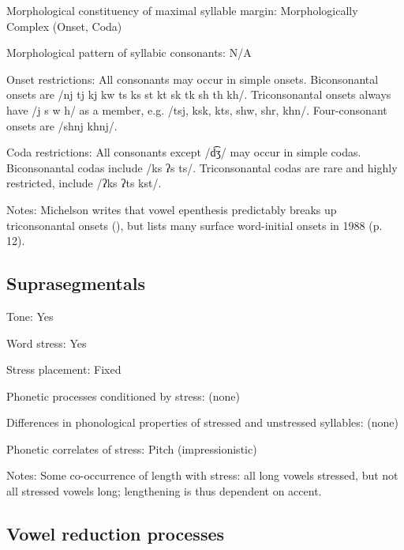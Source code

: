 {\begin{appendixdesc}
\item[Morphological constituency of maximal syllable margin:] Morphologically Complex (Onset, Coda)

\item[Morphological pattern of syllabic consonants:] N/A

\item[Onset restrictions:] All consonants may occur in simple onsets. Biconsonantal onsets are /nj tj kj kw ts ks st kt sk tk sh th kh/. Triconsonantal onsets always have /j s w h/ as a member, e.g. /tsj, ksk, kts, shw, shr, khn/. Four-consonant onsets are /shnj khnj/.

\item[Coda restrictions:] All consonants except /d͡ʒ/ may occur in simple codas. Biconsonantal codas include /ks ʔs ts/. Triconsonantal codas are rare and highly restricted, include /ʔks ʔts kst/.

\item[Notes:] Michelson writes that vowel epenthesis predictably breaks up triconsonantal onsets (\citeyear{Michelson1981}), but lists many surface word-initial onsets in 1988 (p. 12).
\end{appendixdesc}
\subsection*{Suprasegmentals}
\begin{appendixdesc}
\item[Tone:] Yes

\item[Word stress:] Yes

\item[Stress placement:] Fixed

\item[Phonetic processes conditioned by stress:] (none)

\item[Differences in phonological properties of stressed and unstressed syllables:] (none)

\item[Phonetic correlates of stress:] Pitch (impressionistic)

\item[Notes:] Some co-occurrence of length with stress: all long vowels stressed, but not all stressed vowels long; lengthening is thus dependent on accent.
\end{appendixdesc}
\subsection*{Vowel reduction processes}
\begin{appendixdesc}


\end{appendixdesc}}
